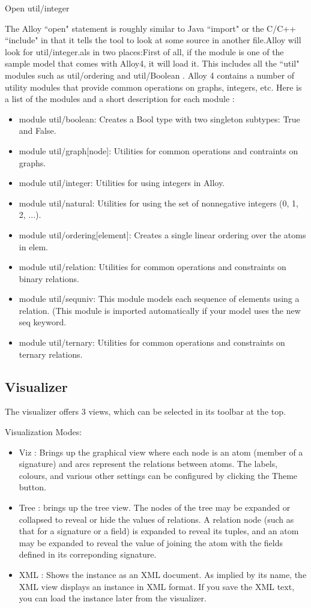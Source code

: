 \documentclass[a4paper,10pt]{report}
\begin{document}
Open util/integer

The Alloy ``open" statement is roughly similar to Java ``import" or the C/C++ ``include" in that it tells the tool to look at some source in another file.Alloy will look for util/integer.als in two places:First of all, if the module is one of the sample model that comes with Alloy4, it will load it. This includes all the ``util" modules such as util/ordering and util/Boolean \cite{DanielJackson}.
Alloy 4 contains a number of utility modules that provide common operations on graphs, integers, etc. Here is a list of the modules and a short description for each module \cite{DanielJackson}:
\begin{itemize}
\item module util/boolean: Creates a Bool type with two singleton subtypes: True and False. 
\item module util/graph[node]: Utilities for common operations and contraints on graphs. 
\item module util/integer: Utilities for using integers in Alloy. 
\item module util/natural: Utilities for using the set of nonnegative integers (0, 1, 2, ...). 
\item module util/ordering[element]: Creates a single linear ordering over the atoms in elem. 
\item module util/relation: Utilities for common operations and constraints on binary relations. 
\item module util/sequniv: This module models each sequence of elements using a relation.
(This module is imported automatically if your model uses the new seq keyword. 
\item module util/ternary: Utilities for common operations and constraints on ternary relations.
\end{itemize}

\subsection{Visualizer} 
\label{visualiser}

The visualizer offers 3 views, which can be selected in its toolbar at the top.

Visualization Modes:
\begin{itemize}
\item Viz : Brings up the graphical view where each node is an atom (member of a signature) and arcs represent the relations between atoms. 
The labels, colours, and various other settings can be configured by clicking the Theme button. 
\item Tree : brings up the tree view. The nodes of the tree may be expanded or collapsed to reveal or hide the values of relations. A relation node (such as that for a signature or a field) is expanded to reveal its tuples, and an atom may be expanded to reveal the value of joining the atom with the fields defined in its correponding signature. 
\item XML : Shows the instance as an XML document. As implied by its name, the XML view displays an instance in XML format. If you save the XML text, you can load the instance later from the visualizer.
\end{itemize}  
\end{document}
